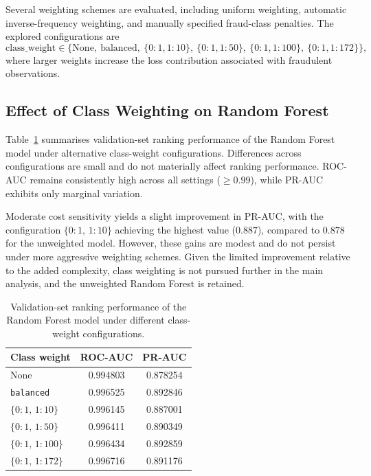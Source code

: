 \documentclass[oneside,12pt,parskip=half,american,numbers=noenddot]{scrreprt}
\begin{document}
Several weighting schemes are evaluated, including uniform weighting, automatic inverse-frequency weighting, and manually specified fraud-class penalties. The explored configurations are
\[
\text{class\_weight} \in \Big\{\text{None},\ \text{balanced},\ \{0\!:\!1,1\!:\!10\},\ \{0\!:\!1,1\!:\!50\},\ \{0\!:\!1,1\!:\!100\},\ \{0\!:\!1,1\!:\!172\}\Big\},
\]
where larger weights increase the loss contribution associated with fraudulent observations.

\subsection{Effect of Class Weighting on Random Forest}
Table~\ref{tab:rf_weight_results} summarises validation-set ranking performance of the Random Forest model under alternative class-weight configurations. Differences across configurations are small and do not materially affect ranking performance. ROC-AUC remains consistently high across all settings ($\ge 0.99$), while PR-AUC exhibits only marginal variation.

Moderate cost sensitivity yields a slight improvement in PR-AUC, with the configuration $\{0\!:\!1,\,1\!:\!10\}$ achieving the highest value ($0.887$), compared to $0.878$ for the unweighted model. However, these gains are modest and do not persist under more aggressive weighting schemes. Given the limited improvement relative to the added complexity, class weighting is not pursued further in the main analysis, and the unweighted Random Forest is retained.

\begin{table}[H]
\centering
\caption{Validation-set ranking performance of the Random Forest model under different class-weight configurations.}
\label{tab:rf_weight_results}
\small
\renewcommand{\arraystretch}{1.2}
\begin{tabular}{lcc}
\hline
\textbf{Class weight} & \textbf{ROC-AUC} & \textbf{PR-AUC} \\
\hline
None                      & 0.994803 & 0.878254 \\
\texttt{balanced}         & 0.996525 & 0.892846 \\
$\{0\!:\!1,\,1\!:\!10\}$   & 0.996145 & 0.887001 \\
$\{0\!:\!1,\,1\!:\!50\}$   & 0.996411 & 0.890349 \\
$\{0\!:\!1,\,1\!:\!100\}$  & 0.996434 & 0.892859 \\
$\{0\!:\!1,\,1\!:\!172\}$  & 0.996716 & 0.891176 \\
\hline
\end{tabular}
\end{table}
\end{document}

